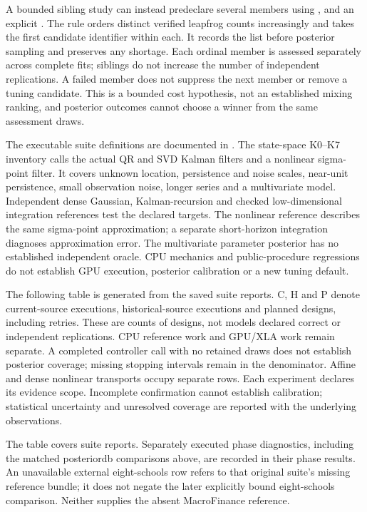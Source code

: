 A bounded sibling study can instead predeclare several members using
,
 and an explicit
. The rule orders distinct verified leapfrog
counts increasingly and takes the first candidate identifier within each.
It records the list before posterior sampling and preserves any shortage.
Each ordinal member is assessed separately across complete fits; siblings do
not increase the number of independent replications. A failed member does not
suppress the next member or remove a tuning candidate. This is a bounded cost
hypothesis, not an established mixing ranking, and posterior outcomes cannot
choose a winner from the same assessment draws.

The executable suite definitions are documented in
. The state-space K0--K7 inventory calls the
actual QR and SVD Kalman filters and a nonlinear sigma-point filter. It covers
unknown location, persistence and noise scales, near-unit persistence, small
observation noise, longer series and a multivariate model. Independent dense
Gaussian, Kalman-recursion and checked low-dimensional integration references
test the declared targets. The nonlinear reference describes the same
sigma-point approximation; a separate short-horizon integration diagnoses
approximation error. The multivariate parameter posterior has no established
independent oracle. CPU mechanics and public-procedure regressions do not
establish GPU execution, posterior calibration or a new tuning default.

The following table is generated from the saved suite
reports. C, H and P denote current-source executions, historical-source
executions and planned designs, including retries. These are counts of designs,
not models declared correct or independent replications. CPU reference work and
GPU/XLA work remain separate. A completed controller call with no retained draws
does not establish posterior coverage; missing stopping intervals remain in the
denominator. Affine and dense nonlinear transports occupy separate rows.
Each experiment declares its evidence scope. Incomplete confirmation cannot
establish calibration; statistical uncertainty and unresolved coverage are
reported with the underlying observations.

The table covers suite reports. Separately executed phase diagnostics, including
the matched posteriordb comparisons above, are recorded in their phase results.
An unavailable external eight-schools row refers to that original suite's
missing reference bundle; it does not negate the later explicitly bound
eight-schools comparison. Neither supplies the absent MacroFinance reference.

